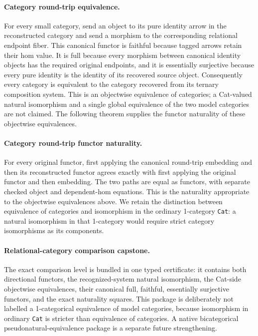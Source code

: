 \documentclass[11pt]{article}
\theoremstyle{definition}
\begin{document}
\paragraph{Category round-trip equivalence.}
For every small category, send an object to its pure identity arrow in the
reconstructed category and send a morphism to the corresponding relational
endpoint fiber.  This canonical functor is faithful because tagged arrows
retain their hom value.  It is full because every morphism between canonical
identity objects has the required original endpoints, and it is essentially
surjective because every pure identity is the identity of its recovered source
object.  Consequently every category is equivalent to the category recovered
from its ternary composition system.  This is an objectwise equivalence of
categories; a Cat-valued natural isomorphism and a single global equivalence of
the two model categories are not claimed.  The following theorem supplies the
functor naturality of these objectwise equivalences.

\paragraph{Category round-trip functor naturality.}
For every original functor, first applying the canonical round-trip embedding
and then its reconstructed functor agrees exactly with first applying the
original functor and then embedding.  The two paths are equal as functors, with
separate checked object and dependent-hom equations.  This is the naturality
appropriate to the objectwise equivalences above.  We retain the distinction
between equivalence of categories and isomorphism in the ordinary
1-category \texttt{Cat}: a natural isomorphism in that 1-category would require
strict category isomorphisms as its components.

\paragraph{Relational-category comparison capstone.}
The exact comparison level is bundled in one typed certificate: it contains
both directional functors, the recognized-system natural isomorphism, the
Cat-side objectwise equivalences, their canonical full, faithful, essentially
surjective functors, and the exact naturality squares.  This package is
deliberately not labelled a 1-categorical equivalence of model categories,
because isomorphism in ordinary \texttt{Cat} is stricter than equivalence of
categories.  A native bicategorical pseudonatural-equivalence package is a
separate future strengthening.
\end{document}
